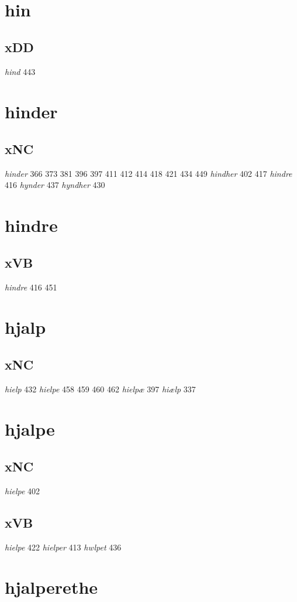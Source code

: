 \documentclass[a4paper,twocolumn]{article}
\begin{document}
\section{hin}
\label{sec:orgf9b4205}
\subsection{xDD}
\label{sec:org9c99a3b}
\emph{hind} 443 
\section{hinder}
\label{sec:orga39b5ca}
\subsection{xNC}
\label{sec:orgedd92f8}
\emph{hinder} 366 373 381 396 397 411 412 414 418 421 434 449 \emph{hindher} 402 417 \emph{hindre} 416 \emph{hynder} 437 \emph{hyndher} 430 
\section{hindre}
\label{sec:org6d185d8}
\subsection{xVB}
\label{sec:org91b3708}
\emph{hindre} 416 451 
\section{hjalp}
\label{sec:org9427137}
\subsection{xNC}
\label{sec:org1498a49}
\emph{hielp} 432 \emph{hielpe} 458 459 460 462 \emph{hielpæ} 397 \emph{hiælp} 337 
\section{hjalpe}
\label{sec:org61ed467}
\subsection{xNC}
\label{sec:org2c517fd}
\emph{hielpe} 402 
\subsection{xVB}
\label{sec:org435b643}
\emph{hielpe} 422 \emph{hielper} 413 \emph{hwlpet} 436 
\section{hjalperethe}
\label{sec:org9933555}
\end{document}
